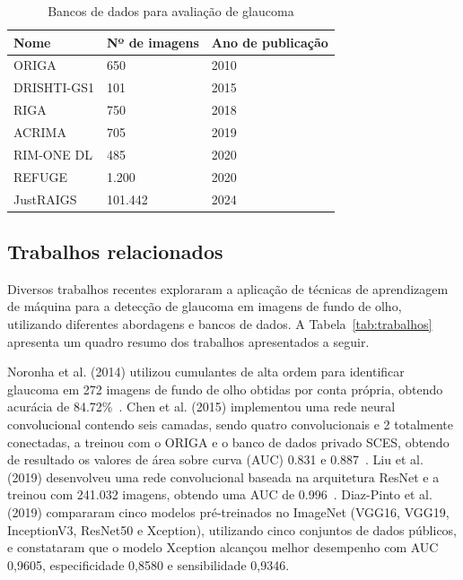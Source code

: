 \documentclass[12pt]{article}
\begin{document}
\begin{table}[htb]
    \centering
    \begin{tabularx}{\textwidth}{XXX}
    \toprule
    \textbf{Nome} & \textbf{Nº de imagens} & \textbf{Ano de publicação} \\
    \midrule
    ORIGA & 650 & 2010 \\
    DRISHTI-GS1 & 101 & 2015 \\
    RIGA & 750 & 2018 \\
    ACRIMA & 705 & 2019 \\
    RIM-ONE DL & 485 & 2020 \\
    REFUGE & 1.200 & 2020 \\
    JustRAIGS & 101.442 & 2024 \\
    \bottomrule
    \end{tabularx}
    \caption{Bancos de dados para avaliação de glaucoma}
    \label{tab:datasets}
\end{table}

\subsection{Trabalhos relacionados}
\label{sec:review:related}

Diversos trabalhos recentes exploraram a aplicação de técnicas de aprendizagem de máquina para a detecção de glaucoma em imagens de fundo de olho, utilizando diferentes abordagens e bancos de dados. A Tabela~\ref{tab:trabalhos} apresenta um quadro resumo dos trabalhos apresentados a seguir.

Noronha et al. (2014) utilizou cumulantes de alta ordem para identificar glaucoma em 272 imagens de fundo de olho obtidas por conta própria, obtendo acurácia de 84.72\%~\cite{noronha2014hoc}. Chen et al. (2015) implementou uma rede neural convolucional contendo seis camadas, sendo quatro convolucionais e 2 totalmente conectadas, a treinou com o ORIGA e o banco de dados privado SCES, obtendo de resultado os valores de área sobre curva (AUC) 0.831 e 0.887~\cite{chen2015cnn}. Liu et al. (2019) desenvolveu uma rede convolucional baseada na arquitetura ResNet e a treinou com 241.032 imagens, obtendo uma AUC de 0.996~\cite{liu_cnn_2019}. Diaz-Pinto et al. (2019) compararam cinco modelos pré-treinados no ImageNet (VGG16, VGG19, InceptionV3, ResNet50 e Xception), utilizando cinco conjuntos de dados públicos, e constataram que o modelo Xception alcançou melhor desempenho com AUC 0,9605, especificidade 0,8580 e sensibilidade 0,9346.
\end{document}
